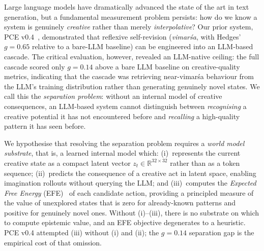 \documentclass[journal,onecolumn,11pt]{IEEEtran}
\begin{document}
Large language models have dramatically advanced the state of the art
in text generation, but a fundamental measurement problem persists:
how do we know a system is genuinely \emph{creative} rather than merely
\emph{interpolative}?
Our prior system, PCE v0.4~\cite{pce2024}, demonstrated that reflexive
self-revision (\emph{vimarśa}, with Hedges' $g{=}0.65$ relative to a
bare-LLM baseline) can be engineered into an LLM-based cascade.
The critical evaluation, however, revealed an LLM-native ceiling: the full
cascade scored only $g{=}0.14$ above a bare LLM baseline on creative-quality
metrics, indicating that the cascade was retrieving near-vimarśa behaviour
from the LLM's training distribution rather than generating genuinely novel
states.
We call this the \emph{separation problem}: without an internal model of
creative consequences, an LLM-based system cannot distinguish between
\emph{recognising} a creative potential it has not encountered before and
\emph{recalling} a high-quality pattern it has seen before.

We hypothesise that resolving the separation problem requires a
\emph{world model substrate}, that is, a learned internal model which:
(i)~represents the current creative state as a compact latent vector
$z_t \in \mathbb{R}^{32 \times 32}$ rather than as a token sequence;
(ii)~predicts the consequence of a creative act in latent space, enabling
imagination rollouts without querying the LLM; and
(iii)~computes the \emph{Expected Free Energy} (EFE)~\cite{friston2017active}
of each candidate action, providing a principled measure of the value of
unexplored states that is zero for already-known patterns and positive for
genuinely novel ones.
Without (i)--(iii), there is no substrate on which to compute epistemic value,
and an EFE objective degenerates to a heuristic.
PCE v0.4 attempted (iii) without (i) and (ii); the $g{=}0.14$ separation gap
is the empirical cost of that omission.
\end{document}
